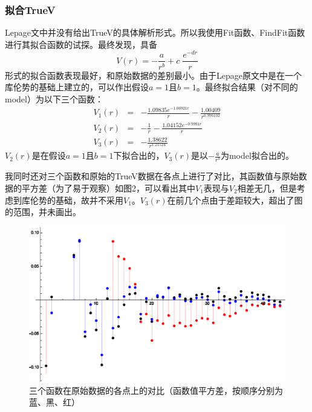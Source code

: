\documentclass{ctexart}
\begin{document}
\subsubsection{拟合TrueV}
Lepage文中并没有给出TrueV的具体解析形式。所以我使用Fit函数、FindFit函数进行其拟合函数的试探。最终发现，具备
$$
V(r)=-\frac{a}{r^b}+c\;\frac{e^{-dr}}{r}
$$
形式的拟合函数表现最好，和原始数据的差别最小。由于Lepage原文中是在一个库伦势的基础上建立的，可以作出假设$a=1$且$b=1$。最终拟合结果（对不同的model）为以下三个函数：
\begin{eqnarray}
  V_1(r) &=& -\frac{1.09835e^{-1.06921r}}{r}-\frac{1.00409}{r^{0.976102}} \\
  V_2(r) &=& -\frac{1}{r}-\frac{1.04152e^{-0.9991r}}{r} \\
  V_3(r) &=& -\frac{1.38622}{r^{1.21524}}
\end{eqnarray}
$V_2(r)$是在假设$a=1$且$b=1$下拟合出的，$V_3(r)$是以$\displaystyle-\frac{a}{r^b}$为model拟合出的。

我同时还对三个函数和原始的TrueV数据在各点上进行了对比，其函数值与原始数据的平方差（为了易于观察）如图2，可以看出其中$V_1$表现与$V_2$相差无几，但是考虑到库伦势的基础，故并不采用$V_1$。$V_3(r)$在前几个点由于差距较大，超出了图的范围，并未画出。
\clearpage
\begin{figure}[!htbp]
  \centering
  \includegraphics[width=4.5in]{Test_ReconstructLepage.eps}
  \caption{三个函数在原始数据的各点上的对比（函数值平方差，按顺序分别为蓝、黑、红）}\label{TrueV}
\end{figure}
\end{document}
